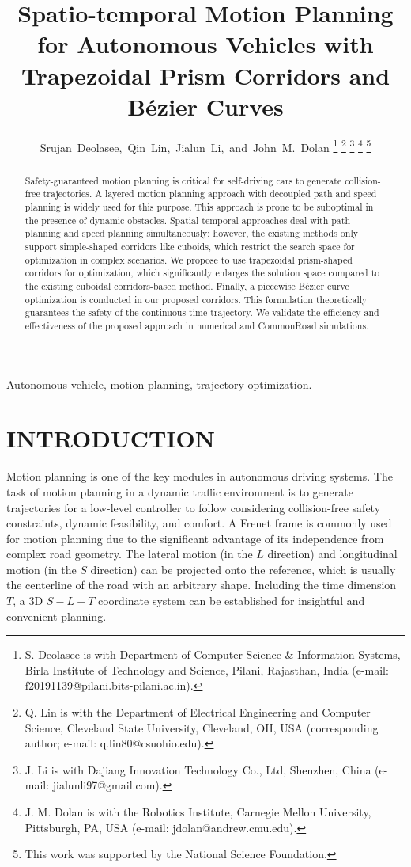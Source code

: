 \documentclass[journal,a4paper,onecolumn,12pt]{IEEEtran}
\title{Spatio-temporal Motion Planning for Autonomous Vehicles with Trapezoidal Prism Corridors and B\'{e}zier Curves}
\author{Srujan~Deolasee,~Qin~Lin,~Jialun~Li,~and~John~M.~Dolan%
\thanks{S. Deolasee is with Department of Computer Science \& Information Systems, Birla Institute of Technology and Science, Pilani, Rajasthan, India (e-mail: f20191139@pilani.bits-pilani.ac.in).}%
\thanks{Q. Lin is with the Department of Electrical Engineering and Computer Science, Cleveland State University, Cleveland, OH, USA (corresponding author; e-mail: q.lin80@csuohio.edu).}%
\thanks{J. Li is with Dajiang Innovation Technology Co., Ltd, Shenzhen, China (e-mail: jialunli97@gmail.com).}%
\thanks{J. M. Dolan is with the Robotics Institute, Carnegie Mellon University, Pittsburgh, PA, USA (e-mail: jdolan@andrew.cmu.edu).}%
\thanks{This work was supported by the National Science Foundation.}%
}
\begin{document}
\maketitle

\begin{abstract}
Safety-guaranteed motion planning is critical for self-driving cars to generate collision-free trajectories. A layered motion planning approach with decoupled path and speed planning is widely used for this purpose. This approach is prone to be suboptimal in the presence of dynamic obstacles. Spatial-temporal approaches deal with path planning and speed planning simultaneously; however, the existing methods only support simple-shaped corridors like cuboids, which restrict the search space for optimization in complex scenarios. We propose to use trapezoidal prism-shaped corridors for optimization, which significantly enlarges the solution space compared to the existing cuboidal corridors-based method. Finally, a piecewise B\'{e}zier curve optimization is conducted in our proposed corridors. This formulation theoretically guarantees the safety of the continuous-time trajectory. We validate the efficiency and effectiveness of the proposed approach in numerical and CommonRoad simulations.
\end{abstract}

\begin{IEEEkeywords}
Autonomous vehicle, motion planning, trajectory optimization.
\end{IEEEkeywords}

\section{INTRODUCTION}

Motion planning is one of the key modules in autonomous driving systems. The task of motion planning in a dynamic traffic environment is to generate trajectories for a low-level controller to follow considering collision-free safety constraints, dynamic feasibility, and comfort. A Frenet frame \cite{werling_optimal_2012} is commonly used for motion planning due to the significant advantage of its independence from complex road geometry. The lateral motion (in the $L$ direction) and longitudinal motion (in the $S$ direction) can be projected onto the reference, which is usually the centerline of the road with an arbitrary shape. Including the time dimension $T$, a 3D $S - L - T$ coordinate system can be established for insightful and convenient planning.
\end{document}
